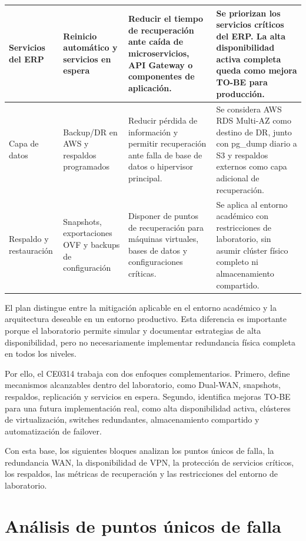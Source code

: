 \documentclass[11pt, a4paper, oneside]{report}
\begin{document}
\begin{xltabular}{\textwidth}{@{}|L{3.1cm}|L{3.4cm}|X|X|@{}}
{\small Servicios del ERP} &
{\small Reinicio automático y servicios en espera} &
{\small Reducir el tiempo de recuperación ante caída de microservicios, API Gateway o componentes de aplicación.} &
{\small Se priorizan los servicios críticos del ERP. La alta disponibilidad activa completa queda como mejora TO-BE para producción.} \\ \hline

{\small Capa de datos} &
{\small Backup/DR en AWS y respaldos programados} &
{\small Reducir pérdida de información y permitir recuperación ante falla de base de datos o hipervisor principal.} &
{\small Se considera AWS RDS Multi-AZ como destino de DR, junto con pg\_dump diario a S3 y respaldos externos como capa adicional de recuperación.} \\ \hline

{\small Respaldo y restauración} &
{\small Snapshots, exportaciones OVF y backups de configuración} &
{\small Disponer de puntos de recuperación para máquinas virtuales, bases de datos y configuraciones críticas.} &
{\small Se aplica al entorno académico con restricciones de laboratorio, sin asumir clúster físico completo ni almacenamiento compartido.} \\ \hline

\end{xltabular}

\normalsize

El plan distingue entre la mitigación aplicable en el entorno académico y la arquitectura deseable en un entorno productivo. Esta diferencia es importante porque el laboratorio permite simular y documentar estrategias de alta disponibilidad, pero no necesariamente implementar redundancia física completa en todos los niveles.

Por ello, el CE0314 trabaja con dos enfoques complementarios. Primero, define mecanismos alcanzables dentro del laboratorio, como Dual-WAN, snapshots, respaldos, replicación y servicios en espera. Segundo, identifica mejoras TO-BE para una futura implementación real, como alta disponibilidad activa, clústeres de virtualización, switches redundantes, almacenamiento compartido y automatización de failover.

Con esta base, los siguientes bloques analizan los puntos únicos de falla, la redundancia WAN, la disponibilidad de VPN, la protección de servicios críticos, los respaldos, las métricas de recuperación y las restricciones del entorno de laboratorio.

\section{Análisis de puntos únicos de falla}
\end{document}
